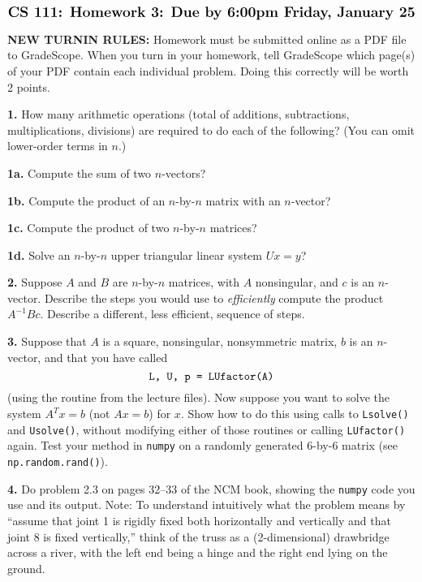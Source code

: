 \documentclass[11pt]{article}
\begin{document}
$$\mbox{\Large \bf CS 111: Homework 3: Due by 6:00pm Friday, January 25}$$
\par\bigskip\noindent
{\bf NEW TURNIN RULES:} Homework must be submitted online as a PDF file to GradeScope.
When you turn in your homework, tell GradeScope which page(s) of your PDF contain
each individual problem. Doing this correctly will be worth 2 points.

\par\bigskip
{\bf 1.}
How many arithmetic operations 
(total of additions, subtractions, multiplications, divisions)
are required to do each of the following?
(You can omit lower-order terms in $n$.)

\par\medskip
{\bf 1a.} Compute the sum of two $n$-vectors?

\par\medskip
{\bf 1b.} Compute the product of an $n$-by-$n$ matrix with an $n$-vector?

\par\medskip
{\bf 1c.} Compute the product of two $n$-by-$n$ matrices?

\par\medskip
{\bf 1d.} Solve an $n$-by-$n$ upper triangular linear system $Ux=y$?


\par\bigskip
{\bf 2.}
Suppose $A$ and $B$ are $n$-by-$n$ matrices, with $A$ nonsingular,
and $c$ is an $n$-vector.
Describe the steps you would use to {\em efficiently} compute the
product $A^{-1}Bc$.
Describe a different, less efficient, sequence of steps.


\par\bigskip
{\bf 3.}
Suppose that $A$ is a square, nonsingular, nonsymmetric matrix, 
$b$ is an $n$-vector, and that you have called 
$$\mbox{\tt L, U, p = LUfactor(A)}$$
(using the routine from the lecture files).
Now suppose you want to solve the system $A^Tx=b$ (not $Ax=b$) for $x$.
Show how to do this using calls to {\tt Lsolve()} and {\tt Usolve()},
without modifying either of those routines or calling {\tt LUfactor()} again.
Test your method in {\tt numpy} on a randomly generated 6-by-6 matrix
(see {\tt np.random.rand()}).


\par\bigskip
{\bf 4.} Do problem 2.3 on pages 32--33 of the NCM book, 
showing the {\tt numpy} code you use and its output. 
Note: To understand intuitively what the problem means by 
``assume that joint 1 is rigidly fixed both horizontally and vertically 
and that joint 8 is fixed vertically,'' 
think of the truss as a (2-dimensional) drawbridge across a river, 
with the left end being a hinge and the right end lying on the ground.
\end{document}
